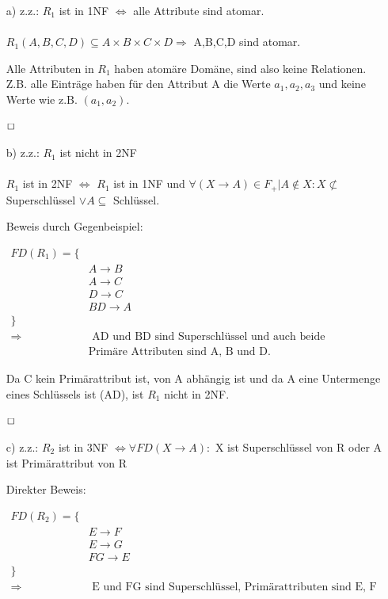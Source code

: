 \begin{enumerate}

\item[a)]
z.z.: $R_1$ ist in 1NF $\Leftrightarrow$ alle Attribute sind atomar. \\ \\
$R_1(A,B,C,D) \subseteq A \times B \times C \times D \Rightarrow $ A,B,C,D sind atomar.

Alle Attributen in $R_1$ haben atomäre Domäne, sind also keine Relationen. Z.B. alle Einträge haben für den Attribut A die Werte $a_1, a_2, a_3$ und keine Werte wie z.B. $(a_1, a_2)$.

$\hfill \Box$

\item[b)]
z.z.: $R_1$ ist nicht in 2NF \\ \\
$R_1$ ist in 2NF $\Leftrightarrow$  $R_1$ ist in 1NF und $\forall (X \rightarrow A) \in F_{+} | A \not\in X: X \not\subset $ Superschlüssel $\lor A \subseteq$ Schlüssel.

Beweis durch Gegenbeispiel:

\begin{align*}
    FD(R_1) = \{ & \\
    & A \rightarrow B \\
    & A \rightarrow C \\
    & D \rightarrow C \\
    & BD \rightarrow A \\
    \} & \\
    \Rightarrow & \text{ AD und BD sind Superschlüssel und auch beide Kandidatschlüsseln.} \\
    & \text{Primäre Attributen sind A, B und D. }
\end{align*}

Da C kein Primärattribut ist, von A abhängig ist und da A eine Untermenge eines Schlüssels ist (AD), ist $R_1$ nicht in 2NF.

$\hfill \Box$

\item[c)]
z.z.: $R_2$  ist in 3NF $\Leftrightarrow \forall FD(X \rightarrow A):$ X ist Superschlüssel von R oder A ist Primärattribut von R

Direkter Beweis: 

\begin{align*}
    FD(R_2) = \{ & \\
    & E \rightarrow F \\
    & E \rightarrow G \\
    & FG \rightarrow E \\
    \} & \\
    \Rightarrow & \text{ E und FG sind Superschlüssel, Primärattributen sind E, F und G. }
\end{align*}


\end{enumerate}
